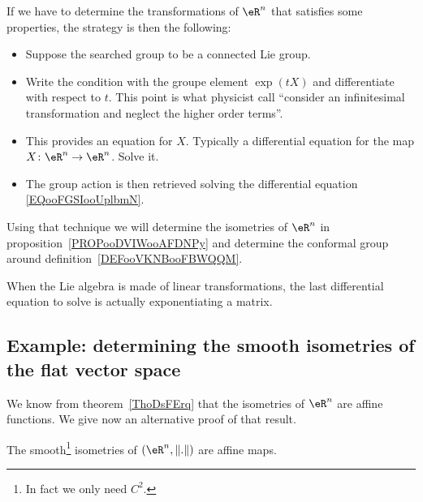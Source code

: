 \begin{normaltext}      \label{NORMooMGAUooIoLtjW}
	If we have to determine the transformations of \( \eR^n\) that satisfies some properties, the strategy is then the following:
	\begin{itemize}
		\item Suppose the searched group to be a connected Lie group.
		\item Write the condition with the groupe element \( \exp(tX)\) and differentiate with respect to \( t\). This point is what physicist call ``consider an infinitesimal transformation and neglect the higher order terms''.
		\item This provides an equation for \( X\). Typically a differential equation for the map \( X\colon \eR^n\to \eR^n\). Solve it.
		\item The group action is then retrieved solving the differential equation \eqref{EQooFGSIooUplbmN}.
	\end{itemize}
	Using that technique we will determine the isometries of \( \eR^n\) in proposition~\ref{PROPooDVIWooAFDNPy} and determine the conformal group around definition~\ref{DEFooVKNBooFBWQQM}.  %
\end{normaltext}

\begin{remark}
	When the Lie algebra is made of linear transformations, the last differential equation to solve is actually exponentiating a matrix.
\end{remark}

\subsection{Example: determining the smooth isometries of the flat vector space}

We know from theorem~\ref{ThoDsFErq} that the isometries of \( \eR^n\) are affine functions. We give now an alternative proof of that result.

\begin{proposition}     \label{PROPooDVIWooAFDNPy}
	The smooth\footnote{In fact we only need \( C^2\).} isometries of \( (\eR^n,\| . \|)  \)  are affine maps.
\end{proposition}

